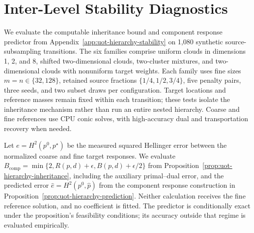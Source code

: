 \section{Inter-Level Stability Diagnostics}
\label{app:stability-experiment}

We evaluate the computable inheritance bound and component response predictor from Appendix~\ref{app:uot-hierarchy-stability} on 1,080 synthetic source-subsampling transitions.
The six families comprise uniform clouds in dimensions 1, 2, and 8, shifted two-dimensional clouds, two-cluster mixtures, and two-dimensional clouds with nonuniform target weights.
Each family uses fine sizes $m=n\in\{32,128\}$, retained source fractions $\{1/4,1/2,3/4\}$, five penalty pairs, three seeds, and two subset draws per configuration.
Target locations and reference masses remain fixed within each transition; these tests isolate the inheritance mechanism rather than run an entire nested hierarchy.
Coarse and fine references use CPU conic solves, with high-accuracy dual and transportation recovery when needed.

Let $e=H^2(p^0,p^\star)$ be the measured squared Hellinger error between the normalized coarse and fine target responses.
We evaluate $B_{\mathrm{comp}}=\min\{2,R(p,d)+\epsilon,B(p,d)+\epsilon/2\}$ from Proposition~\ref{prop:uot-hierarchy-inheritance}, including the auxiliary primal--dual error, and the predicted error $\widehat e=H^2(p^0,\widehat p)$ from the component response construction in Proposition~\ref{prop:uot-hierarchy-prediction}.
Neither calculation receives the fine reference solution, and no coefficient is fitted.
The predictor is conditionally exact under the proposition's feasibility conditions; its accuracy outside that regime is evaluated empirically.

